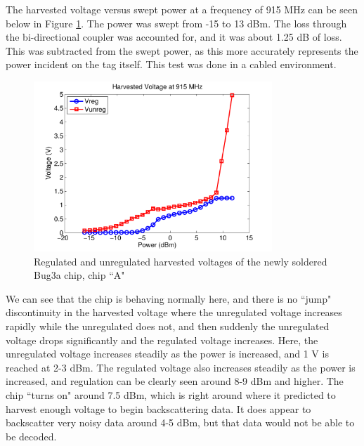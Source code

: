 \documentclass[12pt,onecolumn,titlepage]{article}
\begin{document}
The harvested voltage versus swept power at a frequency of 915 MHz can be seen below in Figure \ref{fig:Bug3a_chipA_voltage_915MHz}. The power was swept from -15 to 13 dBm. The loss through the bi-directional coupler was accounted for, and it was about 1.25 dB of loss. This was subtracted from the swept power, as this more accurately represents the power incident on the tag itself. This test was done in a cabled environment. 


\begin{figure}[htbp]
	\centering
	\includegraphics[width=0.8\textwidth]{Pictures/5July2013/Bug3a_chipA_voltage_915MHz}
	\caption{ Regulated and unregulated harvested voltages of the newly soldered Bug3a chip, chip ``A" } 
	\label{fig:Bug3a_chipA_voltage_915MHz}
\end{figure}



We can see that the chip is behaving normally here, and there is no ``jump" discontinuity in the harvested voltage where the unregulated voltage increases rapidly while the unregulated does not, and then suddenly the unregulated voltage drops significantly and the regulated voltage increases. Here, the unregulated voltage increases steadily as the power is increased, and 1 V is reached at 2-3 dBm. The regulated voltage also increases steadily as the power is increased, and regulation can be clearly seen around 8-9 dBm and higher. The chip ``turns on" around 7.5 dBm, which is right around where it predicted to harvest enough voltage to begin backscattering data. It does appear to backscatter very noisy data around 4-5 dBm, but that data would not be able to be decoded.




\clearpage
\end{document}
